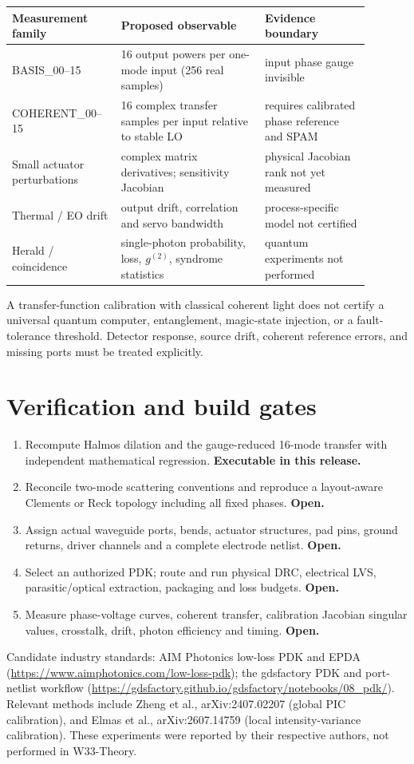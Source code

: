 \documentclass[10pt]{article}
\begin{document}
\begin{longtable}{p{0.25\linewidth}p{0.37\linewidth}p{0.27\linewidth}}
\toprule Measurement family & Proposed observable & Evidence boundary\\\midrule
BASIS\_00--15 & 16 output powers per one-mode input (256 real samples) & input phase gauge invisible\\
COHERENT\_00--15 & 16 complex transfer samples per input relative to stable LO & requires calibrated phase reference and SPAM\\
Small actuator perturbations & complex matrix derivatives; sensitivity Jacobian & physical Jacobian rank not yet measured\\
Thermal / EO drift & output drift, correlation and servo bandwidth & process-specific model not certified\\
Herald / coincidence & single-photon probability, loss, $g^{(2)}$, syndrome statistics & quantum experiments not performed\\\bottomrule
\end{longtable}
A transfer-function calibration with classical coherent light does not certify a universal quantum computer, entanglement, magic-state injection, or a fault-tolerance threshold. Detector response, source drift, coherent reference errors, and missing ports must be treated explicitly.

\section{Verification and build gates}
\begin{enumerate}
\item Recompute Halmos dilation and the gauge-reduced 16-mode transfer with independent mathematical regression. \textbf{Executable in this release.}
\item Reconcile two-mode scattering conventions and reproduce a layout-aware Clements or Reck topology including all fixed phases. \textbf{Open.}
\item Assign actual waveguide ports, bends, actuator structures, pad pins, ground returns, driver channels and a complete electrode netlist. \textbf{Open.}
\item Select an authorized PDK; route and run physical DRC, electrical LVS, parasitic/optical extraction, packaging and loss budgets. \textbf{Open.}
\item Measure phase-voltage curves, coherent transfer, calibration Jacobian singular values, crosstalk, drift, photon efficiency and timing. \textbf{Open.}
\end{enumerate}
Candidate industry standards: AIM Photonics low-loss PDK and EPDA (\url{https://www.aimphotonics.com/low-loss-pdk}); the gdsfactory PDK and port-netlist workflow (\url{https://gdsfactory.github.io/gdsfactory/notebooks/08_pdk/}). Relevant methods include Zheng et al., arXiv:2407.02207 (global PIC calibration), and Elmas et al., arXiv:2607.14759 (local intensity-variance calibration). These experiments were reported by their respective authors, not performed in W33-Theory.
\end{document}
